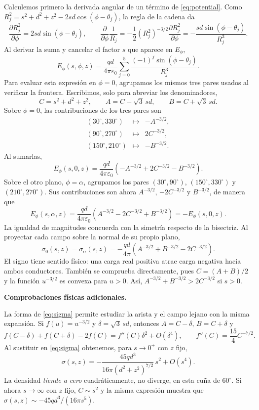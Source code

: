\documentclass[11pt,a4paper]{article}
\begin{document}
Calculemos primero la derivada angular de un término de
\eqref{eq:potential}. Como
$R_j^2=s^2+d^2+z^2-2sd\cos(\phi-\theta_j)$, la regla de la cadena da
\[
\frac{\partial R_j^2}{\partial\phi}
=2sd\sin(\phi-\theta_j),\qquad
\frac{\partial}{\partial\phi}\frac1{R_j}
=-\frac12(R_j^2)^{-3/2}
  \frac{\partial R_j^2}{\partial\phi}
=-\frac{sd\sin(\phi-\theta_j)}{R_j^3}.
\]
Al derivar la suma y cancelar el factor $s$ que aparece en $E_\phi$,
\[
E_\phi(s,\phi,z)=\frac{qd}{4\pi\varepsilon_0}
\sum_{j=0}^{5}
\frac{(-1)^j\sin(\phi-\theta_j)}{R_j^3}.
\]
Para evaluar esta expresión en $\phi=0$, agrupamos los mismos tres
pares usados al verificar la frontera. Escribimos, solo para abreviar
los denominadores,
\[
C=s^2+d^2+z^2,\qquad
A=C-\sqrt{3}\,sd,\qquad B=C+\sqrt{3}\,sd.
\]
Sobre $\phi=0$, las contribuciones de los tres pares son
\[
\begin{array}{rcl}
(30^\circ,330^\circ)&\longmapsto&-A^{-3/2},\\
(90^\circ,270^\circ)&\longmapsto& 2C^{-3/2},\\
(150^\circ,210^\circ)&\longmapsto&-B^{-3/2}.
\end{array}
\]
Al sumarlas,
\[
E_\phi(s,0,z)=\frac{qd}{4\pi\varepsilon_0}
\left(-A^{-3/2}+2C^{-3/2}-B^{-3/2}\right).
\]
Sobre el otro plano, $\phi=\alpha$, agrupamos los pares
$(30^\circ,90^\circ)$, $(150^\circ,330^\circ)$ y
$(210^\circ,270^\circ)$. Sus contribuciones son ahora
$A^{-3/2}$, $-2C^{-3/2}$ y $B^{-3/2}$, de manera que
\[
E_\phi(s,\alpha,z)=\frac{qd}{4\pi\varepsilon_0}
\left(A^{-3/2}-2C^{-3/2}+B^{-3/2}\right)
=-E_\phi(s,0,z).
\]
La igualdad de magnitudes concuerda con la simetría respecto de la
bisectriz. Al proyectar cada campo sobre la normal de su propio plano,
\begin{equation}
\boxed{\displaystyle
\sigma_0(s,z)=\sigma_\alpha(s,z)=
-\frac{qd}{4\pi}
\left(A^{-3/2}+B^{-3/2}-2C^{-3/2}\right).}
\label{eq:sigma}
\end{equation}
El signo tiene sentido físico: una carga real positiva atrae carga
negativa hacia ambos conductores. También se comprueba directamente,
pues $C=(A+B)/2$ y la función $u^{-3/2}$ es convexa para $u>0$.
Así, $A^{-3/2}+B^{-3/2}>2C^{-3/2}$ si $s>0$.

\textbf{Comprobaciones físicas adicionales.}\par
La forma de \eqref{eq:sigma} permite estudiar la arista y el campo
lejano con la misma expansión. Si $f(u)=u^{-3/2}$ y
$\delta=\sqrt3\,sd$, entonces $A=C-\delta$, $B=C+\delta$ y
\[
f(C-\delta)+f(C+\delta)-2f(C)
=f''(C)\delta^2+O(\delta^4),
\qquad f''(C)=\frac{15}{4}C^{-7/2}.
\]
Al sustituir en \eqref{eq:sigma} obtenemos, para $s\to0^+$ con $z$
fijo,
\[
\sigma(s,z)=
-\frac{45qd^3}{16\pi(d^2+z^2)^{7/2}}\,s^2+O(s^4).
\]
La densidad \emph{tiende a cero} cuadráticamente, no diverge, en esta
cuña de $60^\circ$. Si ahora $s\to\infty$ con $z$ fijo, $C\sim s^2$
y la misma expresión muestra que
$\sigma(s,z)\sim-45qd^3/(16\pi s^5)$.
\end{document}
